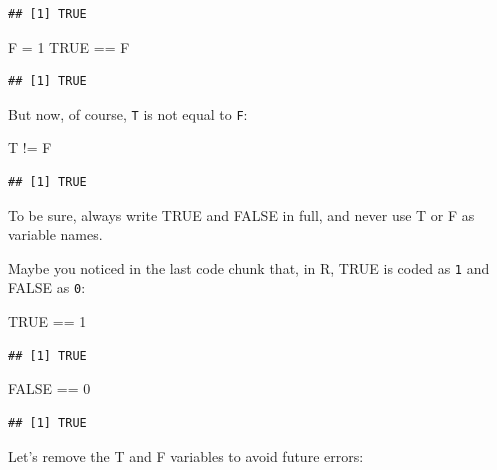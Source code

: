 \documentclass[
]{book}
\newenvironment{Shaded}{\begin{snugshade}}{\end{snugshade}}
\newcommand{\ConstantTok}[1]{\textcolor[rgb]{0.00,0.00,0.00}{#1}}
\newcommand{\DecValTok}[1]{\textcolor[rgb]{0.00,0.00,0.81}{#1}}
\newcommand{\NormalTok}[1]{#1}
\newcommand{\OtherTok}[1]{\textcolor[rgb]{0.56,0.35,0.01}{#1}}
\newcommand{\SpecialCharTok}[1]{\textcolor[rgb]{0.00,0.00,0.00}{#1}}
\theoremstyle{definition}
\theoremstyle{definition}
\theoremstyle{definition}
\theoremstyle{definition}
\theoremstyle{remark}
\begin{document}
\begin{verbatim}
## [1] TRUE
\end{verbatim}

\begin{Shaded}
\begin{Highlighting}[]
\NormalTok{F }\OtherTok{=} \DecValTok{1}
\ConstantTok{TRUE} \SpecialCharTok{==}\NormalTok{ F}
\end{Highlighting}
\end{Shaded}

\begin{verbatim}
## [1] TRUE
\end{verbatim}

But now, of course, \texttt{T} is not equal to \texttt{F}:

\begin{Shaded}
\begin{Highlighting}[]
\NormalTok{T }\SpecialCharTok{!=}\NormalTok{ F}
\end{Highlighting}
\end{Shaded}

\begin{verbatim}
## [1] TRUE
\end{verbatim}

To be sure, always write TRUE and FALSE in full, and never use T or F as variable names.

Maybe you noticed in the last code chunk that, in R, TRUE is coded as \texttt{1} and FALSE as \texttt{0}:

\begin{Shaded}
\begin{Highlighting}[]
\ConstantTok{TRUE} \SpecialCharTok{==} \DecValTok{1}
\end{Highlighting}
\end{Shaded}

\begin{verbatim}
## [1] TRUE
\end{verbatim}

\begin{Shaded}
\begin{Highlighting}[]
\ConstantTok{FALSE} \SpecialCharTok{==} \DecValTok{0}
\end{Highlighting}
\end{Shaded}

\begin{verbatim}
## [1] TRUE
\end{verbatim}

Let's remove the T and F variables to avoid future errors:
\end{document}
